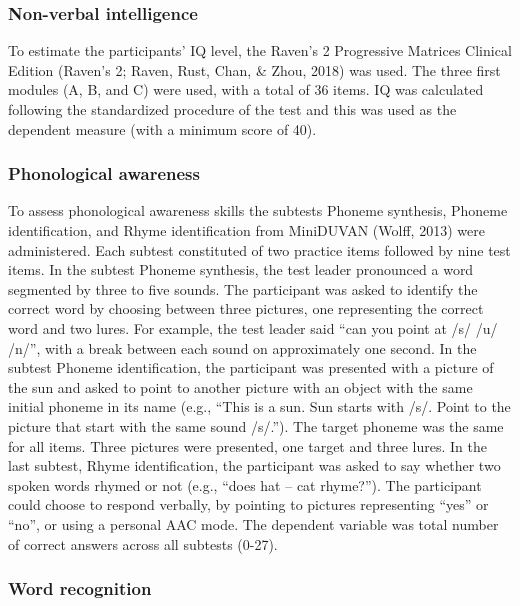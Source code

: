 \documentclass[
]{article}
\begin{document}
\hypertarget{non-verbal-intelligence}{%
\subsubsection{Non-verbal intelligence}\label{non-verbal-intelligence}}

To estimate the participants' IQ level, the Raven's 2 Progressive
Matrices Clinical Edition (Raven's 2; Raven, Rust, Chan, \& Zhou, 2018)
was used. The three first modules (A, B, and C) were used, with a total
of 36 items. IQ was calculated following the standardized procedure of
the test and this was used as the dependent measure (with a minimum
score of 40).

\hypertarget{phonological-awareness}{%
\subsubsection{Phonological awareness}\label{phonological-awareness}}

To assess phonological awareness skills the subtests Phoneme synthesis,
Phoneme identification, and Rhyme identification from MiniDUVAN (Wolff,
2013) were administered. Each subtest constituted of two practice items
followed by nine test items. In the subtest Phoneme synthesis, the test
leader pronounced a word segmented by three to five sounds. The
participant was asked to identify the correct word by choosing between
three pictures, one representing the correct word and two lures. For
example, the test leader said ``can you point at /s/ /u/ /n/'', with a
break between each sound on approximately one second. In the subtest
Phoneme identification, the participant was presented with a picture of
the sun and asked to point to another picture with an object with the
same initial phoneme in its name (e.g., ``This is a sun. Sun starts with
/s/. Point to the picture that start with the same sound /s/.''). The
target phoneme was the same for all items. Three pictures were
presented, one target and three lures. In the last subtest, Rhyme
identification, the participant was asked to say whether two spoken
words rhymed or not (e.g., ``does hat -- cat rhyme?''). The participant
could choose to respond verbally, by pointing to pictures representing
``yes'' or ``no'', or using a personal AAC mode. The dependent variable
was total number of correct answers across all subtests (0-27).

\hypertarget{word-recognition}{%
\subsubsection{Word recognition}\label{word-recognition}}
\end{document}
